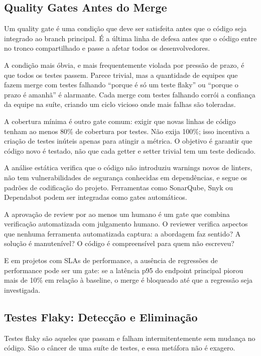 \subsection{Quality Gates Antes do Merge}

Um quality gate é uma condição que deve ser satisfeita antes que o código
seja integrado ao branch principal. É a última linha de defesa antes que o
código entre no tronco compartilhado e passe a afetar todos os
desenvolvedores.

A condição mais óbvia, e mais frequentemente violada por pressão de prazo,
é que todos os testes passem. Parece trivial, mas a quantidade de equipes
que fazem merge com testes falhando ``porque é só um teste flaky'' ou ``porque
o prazo é amanhã'' é alarmante. Cada merge com testes falhando corrói a
confiança da equipe na suíte, criando um ciclo vicioso onde mais falhas são
toleradas.

A cobertura mínima é outro gate comum: exigir que novas linhas de código tenham
ao menos 80\% de cobertura por testes. Não exija 100\%; isso incentiva a
criação de testes inúteis apenas para atingir a métrica. O objetivo é garantir
que código novo é testado, não que cada getter e setter trivial tem um teste
dedicado.

A análise estática verifica que o código não introduziu warnings novos de
linters, não tem vulnerabilidades de segurança conhecidas em dependências, e
segue os padrões de codificação do projeto. Ferramentas como SonarQube,
Snyk ou Dependabot podem ser integradas como gates automáticos.

A aprovação de review por ao menos um humano é um gate que combina verificação
automatizada com julgamento humano. O reviewer verifica aspectos que nenhuma
ferramenta automatizada captura: a abordagem faz sentido? A solução é
manutenível? O código é compreensível para quem não escreveu?

E em projetos com SLAs de performance, a ausência de regressões de performance
pode ser um gate: se a latência p95 do endpoint principal piorou mais de 10\% em
relação à baseline, o merge é bloqueado até que a regressão seja investigada.

\subsection{Testes Flaky: Detecção e Eliminação}

Testes flaky são aqueles que passam e falham intermitentemente sem mudança no
código. São o câncer de uma suíte de testes, e essa metáfora não é exagero.

